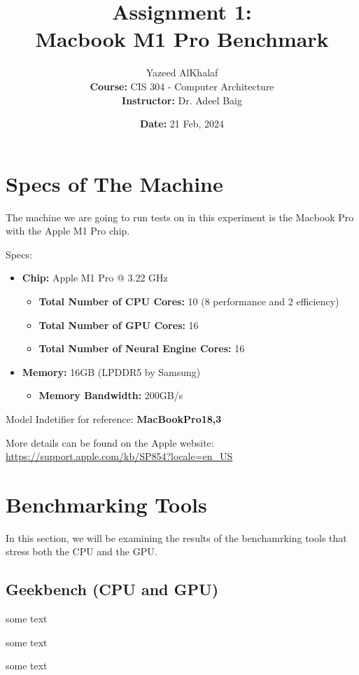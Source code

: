 \documentclass[a4paper]{article}
\title{\textbf{Assignment 1:\\Macbook M1 Pro Benchmark}}
\author{
    Yazeed AlKhalaf\\
    \textbf{Course:} CIS 304 - Computer Architecture\\
    \textbf{Instructor:} Dr. Adeel Baig
}
\date{\textbf{Date:} 21 Feb, 2024}
\begin{document}
\maketitle

\newpage

\section{Specs of The Machine}

The machine we are going to run tests on in this experiment is the Macbook Pro with the Apple M1 Pro chip.

Specs:
\begin{itemize}
    \item \textbf{Chip:} Apple M1 Pro @ 3.22 GHz
    \begin{itemize}
        \item \textbf{Total Number of CPU Cores:} 10 (8 performance and 2 efficiency)
        \item \textbf{Total Number of GPU Cores:} 16
        \item \textbf{Total Number of Neural Engine Cores:} 16
    \end{itemize}
    \item \textbf{Memory:} 16GB (LPDDR5 by Samsung)
    \begin{itemize}
        \item \textbf{Memory Bandwidth:} 200GB/s
    \end{itemize}
\end{itemize}

Model Indetifier for reference: \textbf{MacBookPro18,3}

More details can be found on the Apple website: \url{https://support.apple.com/kb/SP854?locale=en_US}

\section{Benchmarking Tools}

In this section, we will be examining the results of the benchamrking tools that stress both the CPU and the GPU.

\subsection{Geekbench (CPU and GPU)}

some text

some text

some text
\end{document}
